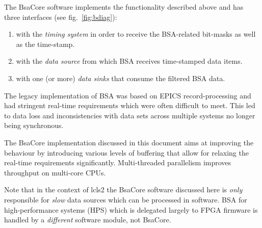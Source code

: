 \documentclass[11pt]{article}
\newcommand{\bsac}{BsaCore}
\newcommand{\bsa} {BSA}
\begin{document}
The \bsac{} software implements the functionality described above and has three
interfaces (see fig.~\ref{fig:bdiag}):
\begin{enumerate}
\item with the {\em timing system} in order to receive the \bsa-related bit-masks as well as
      the time-stamp.
\item with the {\em data source} from which \bsa{} receives time-stamped data items.
\item with one (or more) {\em data sinks} that consume the filtered \bsa{} data.
\end{enumerate}

The legacy implementation of \bsa{} was based on EPICS record-processing and had stringent
real-time requirements which were often difficult to meet. This led to data loss and
inconsistencies with data sets across multiple systems no longer being synchronous.

The \bsac{} implementation discussed in this document aims at improving the behaviour by
introducing various levels of buffering that allow for relaxing the real-time requirements
significantly. Multi-threaded parallelism improves throughput on multi-core CPUs.

Note that in the context of lcls2 the \bsac{} software discussed here is {\em only}
responsible for {\em slow} data sources which can be processed in software. \bsa{} for
high-performance systems (HPS) which is delegated largely to FPGA firmware is handled
by a {\em different} software module, not \bsac{}.
\end{document}
